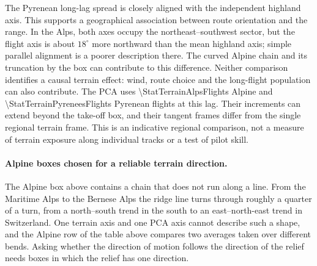 The Pyrenean long-lag spread is closely aligned with the independent highland
axis. This supports a geographical association between route orientation and
the range. In the Alps, both axes occupy the northeast--southwest sector, but
the flight axis is about $18^\circ$ more northward than the mean highland axis;
simple parallel alignment is a poorer description there. The curved Alpine
chain and its truncation by the box can contribute to this difference.
Neither comparison identifies a causal terrain effect: wind, route choice and
the long-flight population can also contribute. The PCA uses
\num{\StatTerrainAlpsFlights} Alpine and \num{\StatTerrainPyreneesFlights}
Pyrenean flights at this lag. Their increments can extend beyond the
take-off box, and their tangent frames differ from the single regional terrain
frame. This is an indicative regional comparison, not a measure of terrain
exposure along individual tracks or a test of pilot skill.

\paragraph{Alpine boxes chosen for a reliable terrain direction.}
The Alpine box above contains a chain that does not run along a line. From the
Maritime Alps to the Bernese Alps the ridge line turns through roughly a quarter
of a turn, from a north--south trend in the south to an east--north-east trend in
Switzerland. One terrain axis and one PCA axis cannot describe such a shape, and the
Alpine row of the table above compares two averages taken over different bends. Asking
whether the direction of motion follows the direction of the relief needs boxes in
which the relief has one direction.


